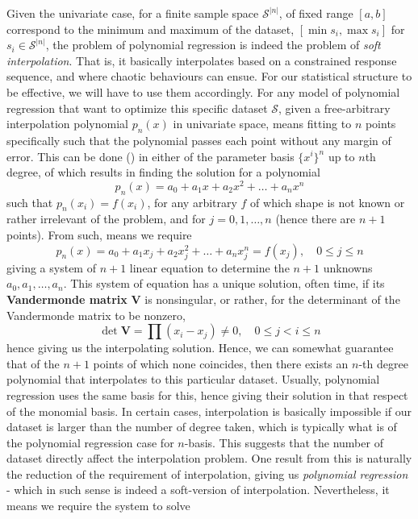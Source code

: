 Given the univariate case, for a finite sample space $\mathcal{S}^{\lvert n\rvert}$, of fixed range $[a,b]$ correspond to the minimum and maximum of the dataset, $[\min s_{i},\max s_{i}]$ for $s_{i}\in \mathcal{S}^{\lvert n\rvert}$, the problem of polynomial regression is indeed the problem of \textit{soft interpolation}. That is, it basically interpolates based on a constrained response sequence, and where chaotic behaviours can ensue. For our statistical structure to be effective, we will have to use them accordingly. For any model of polynomial regression that want to optimize this specific dataset $\mathcal{S}$, given a free-arbitrary interpolation polynomial $p_{n}(x)$ in univariate space, means fitting to $n$ points specifically such that the polynomial passes each point without any margin of error. This can be done (\cite{McArtneyInterpolation2003}) in either of the parameter basis $\{x^{i}\}^{n}$ up to $n$th degree, of which results in finding the solution for a polynomial 
\begin{equation}
    p_{n}(x) = a_{0} + a_{1} x + a_{2} x^{2} + \dots + a_{n}x^{n} 
\end{equation}
such that $p_{n}(x_{i})=f(x_{i})$, for any arbitrary $f$ of which shape is not known or rather irrelevant of the problem, and for $j=0,1,\dots,n$ (hence there are $n+1$ points). From such, means we require 
\begin{equation}
    p_{n}(x) = a_{0} + a_{1} x_{j} + a_{2} x^{2}_{j} + \dots + a_{n}x^{n}_{j} = f(x_{j}), \quad 0 \leq j \leq n 
\end{equation}
giving a system of $n+1$ linear equation to determine the $n+1$ unknowns $a_{0},a_{1},\dots,a_{n}$. This system of equation has a unique solution, often time, if its \textbf{Vandermonde matrix} $\mathbf{V}$ is nonsingular, or rather, for the determinant of the Vandermonde matrix to be nonzero, \begin{equation}
    \det{\mathbf{V}} = \prod (x_{i}-x_{j}) \ne 0 , \quad 0 \leq j < i \leq n 
\end{equation}
hence giving us the interpolating solution. Hence, we can somewhat guarantee that of the $n+1$ points of which none coincides, then there exists an $n$-th degree polynomial that interpolates to this particular dataset. Usually, polynomial regression uses the same basis for this, hence giving their solution in that respect of the monomial basis. In certain cases, interpolation is basically impossible if our dataset is larger than the number of degree taken, which is typically what is of the polynomial regression case for $n$-basis. This suggests that the number of dataset directly affect the interpolation problem. One result from this is naturally the reduction of the requirement of interpolation, giving us \textit{polynomial regression} - which in such sense is indeed a soft-version of interpolation. Nevertheless, it means we require the system to solve 
